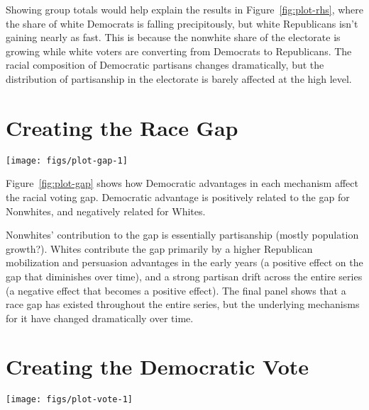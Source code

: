 \documentclass[12pt,]{article}
\theoremstyle{definition}
\theoremstyle{definition}
\theoremstyle{definition}
\theoremstyle{remark}
\begin{document}
Showing group totals would help explain the results in
Figure~\ref{fig:plot-rhs}, where the share of white Democrats is falling
precipitously, but white Republicans isn't gaining nearly as fast. This
is because the nonwhite share of the electorate is growing while white
voters are converting from Democrats to Republicans. The racial
composition of Democratic partisans changes dramatically, but the
distribution of partisanship in the electorate is barely affected at the
high level.

\FloatBarrier

\hypertarget{creating-the-race-gap}{%
\section{Creating the Race Gap}\label{creating-the-race-gap}}

\begin{sidewaysfigure}

{\centering \texttt{[image: figs/plot-gap-1]} 

}

\caption{Effects on Gap}\label{fig:plot-gap}
\end{sidewaysfigure}

Figure~\ref{fig:plot-gap} shows how Democratic advantages in each
mechanism affect the racial voting gap. Democratic advantage is
positively related to the gap for Nonwhites, and negatively related for
Whites.

Nonwhites' contribution to the gap is essentially partisanship (mostly
population growth?). Whites contribute the gap primarily by a higher
Republican mobilization and persuasion advantages in the early years (a
positive effect on the gap that diminishes over time), and a strong
partisan drift across the entire series (a negative effect that becomes
a positive effect). The final panel shows that a race gap has existed
throughout the entire series, but the underlying mechanisms for it have
changed dramatically over time.

\FloatBarrier

\hypertarget{creating-the-democratic-vote}{%
\section{Creating the Democratic
Vote}\label{creating-the-democratic-vote}}

\begin{sidewaysfigure}

{\centering \texttt{[image: figs/plot-vote-1]} 

}

\caption{Effects on Vote}\label{fig:plot-vote}
\end{sidewaysfigure}
\end{document}
